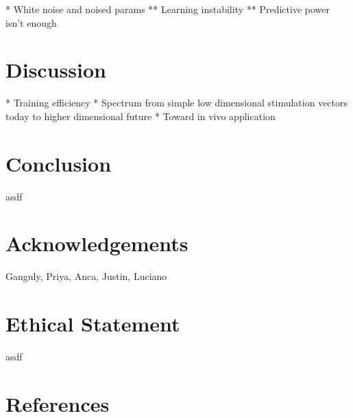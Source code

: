 \documentclass[12pt]{iopart}
\begin{document}
* White noise and noised params
** Learning instability
** Predictive power isn't enough

\section{Discussion}
* Training efficiency
* Spectrum from simple low dimensional stimulation vectors today to higher dimensional future
* Toward in vivo application

\section{Conclusion}
asdf

\section{Acknowledgements}
Ganguly, Priya, Anca, Justin, Luciano

\section{Ethical Statement}
asdf

\section{References}


\end{document}
